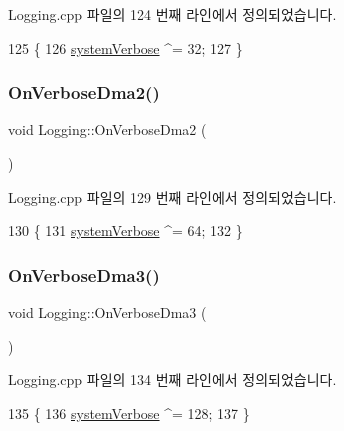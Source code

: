 Logging.\+cpp 파일의 124 번째 라인에서 정의되었습니다.


\begin{DoxyCode}
125 \{
126   \mbox{\hyperlink{system_8cpp_a67739df6b2271a8b807f01c50a610478}{systemVerbose}} ^= 32;
127 \}
\end{DoxyCode}
\mbox{\label{class_logging_a5976754962789093961701eeeca3e0a9}} 
\subsubsection{\texorpdfstring{On\+Verbose\+Dma2()}{OnVerboseDma2()}}
{\footnotesize\ttfamily void Logging\+::\+On\+Verbose\+Dma2 (\begin{DoxyParamCaption}{ }\end{DoxyParamCaption})\hspace{0.3cm}{\ttfamily [protected]}}



Logging.\+cpp 파일의 129 번째 라인에서 정의되었습니다.


\begin{DoxyCode}
130 \{
131   \mbox{\hyperlink{system_8cpp_a67739df6b2271a8b807f01c50a610478}{systemVerbose}} ^= 64;
132 \}
\end{DoxyCode}
\mbox{\label{class_logging_acbb2488ba65d526996806d3a4156bac9}} 
\subsubsection{\texorpdfstring{On\+Verbose\+Dma3()}{OnVerboseDma3()}}
{\footnotesize\ttfamily void Logging\+::\+On\+Verbose\+Dma3 (\begin{DoxyParamCaption}{ }\end{DoxyParamCaption})\hspace{0.3cm}{\ttfamily [protected]}}



Logging.\+cpp 파일의 134 번째 라인에서 정의되었습니다.


\begin{DoxyCode}
135 \{
136   \mbox{\hyperlink{system_8cpp_a67739df6b2271a8b807f01c50a610478}{systemVerbose}} ^= 128;
137 \}
\end{DoxyCode}
\mbox{\label{class_logging_a33d7f61c6216cb3cff88fd4e1e614087}} 
